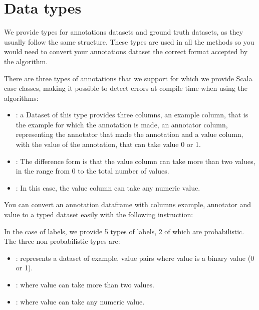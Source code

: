 \documentclass[letterpaper,10pt,english]{sphinxmanual}
\begin{document}
\section{Data types}
\label{\detokenize{package/design:data-types}}
We provide types for annotations datasets and ground truth datasets, as they usually follow
the same structure. These types are used in all the methods so you would need to convert
your annotations dataset the correct format accepted by the algorithm.

There are three types of annotations that we support for which we provide Scala case classes,
making it possible to detect errors at compile time when using the algorithms:
\begin{itemize}
\item {} 
: a Dataset of this type provides three columns, an example column, that
is the example for which the annotation is made, an annotator column, representing the
annotator that made the annotation and a value column, with the value of the annotation, that
can take value 0 or 1.

\item {} 
: The difference form  is that the value column can
take more than two values, in the range from 0 to the total number of values.

\item {} 
: In this case, the value column can take any numeric value.

\end{itemize}

You can convert an annotation dataframe with columns example, annotator and value to a
typed dataset easily with the following instruction:

%
\begin{sphinxVerbatim}[commandchars=\\\{\}]
   \PYG{o}{[}\PYG{o}{]}
\end{sphinxVerbatim}

In the case of labels, we provide 5 types of labels, 2 of which are probabilistic. The three non probabilistic
types are:
\begin{itemize}
\item {} 
: represents a dataset of example, value pairs where value is a binary value (0 or 1).

\item {} 
: where value can take more than two values.

\item {} 
: where value can take any numeric value.

\end{itemize}
\end{document}
